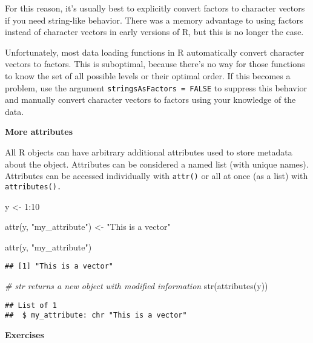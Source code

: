 \documentclass[
]{book}
\newenvironment{Shaded}{\begin{snugshade}}{\end{snugshade}}
\newcommand{\CommentTok}[1]{\textcolor[rgb]{0.56,0.35,0.01}{\textit{#1}}}
\newcommand{\DecValTok}[1]{\textcolor[rgb]{0.00,0.00,0.81}{#1}}
\newcommand{\FunctionTok}[1]{\textcolor[rgb]{0.00,0.00,0.00}{#1}}
\newcommand{\NormalTok}[1]{#1}
\newcommand{\OtherTok}[1]{\textcolor[rgb]{0.56,0.35,0.01}{#1}}
\newcommand{\SpecialCharTok}[1]{\textcolor[rgb]{0.00,0.00,0.00}{#1}}
\newcommand{\StringTok}[1]{\textcolor[rgb]{0.31,0.60,0.02}{#1}}
\begin{document}
For this reason, it's usually best to explicitly convert factors to character vectors if you need string-like behavior. There was a memory advantage to using factors instead of character vectors in early versions of R, but this is no longer the case.

Unfortunately, most data loading functions in R automatically convert character vectors to factors. This is suboptimal, because there's no way for those functions to know the set of all possible levels or their optimal order. If this becomes a problem, use the argument \texttt{stringsAsFactors\ =\ FALSE} to suppress this behavior and manually convert character vectors to factors using your knowledge of the data.

\textbf{More attributes}

All R objects can have arbitrary additional attributes used to store metadata about the object. Attributes can be considered a named list (with unique names). Attributes can be accessed individually with \texttt{attr()} or all at once (as a list) with \texttt{attributes().}

\begin{Shaded}
\begin{Highlighting}[]
\NormalTok{y }\OtherTok{\textless{}{-}} \DecValTok{1}\SpecialCharTok{:}\DecValTok{10}

\FunctionTok{attr}\NormalTok{(y, }\StringTok{"my\_attribute"}\NormalTok{) }\OtherTok{\textless{}{-}} \StringTok{"This is a vector"}

\FunctionTok{attr}\NormalTok{(y, }\StringTok{"my\_attribute"}\NormalTok{)}
\end{Highlighting}
\end{Shaded}

\begin{verbatim}
## [1] "This is a vector"
\end{verbatim}

\begin{Shaded}
\begin{Highlighting}[]
\CommentTok{\# str returns a new object with modified information}
\FunctionTok{str}\NormalTok{(}\FunctionTok{attributes}\NormalTok{(y))}
\end{Highlighting}
\end{Shaded}

\begin{verbatim}
## List of 1
##  $ my_attribute: chr "This is a vector"
\end{verbatim}

\textbf{Exercises}
\end{document}
